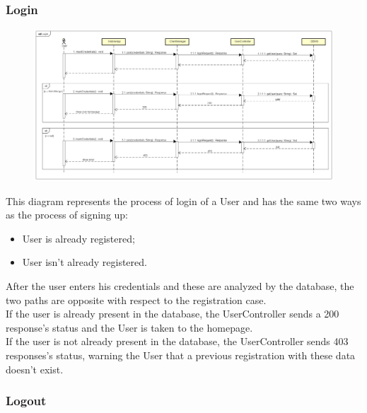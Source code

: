 \newpage
\subsubsection{Login}

\begin{figure}[H]
    \begin{center}
        \includegraphics[width=\textwidth]{Images/SequenceDiagrams/LoginDD.png}
    \end{center}
\end{figure}

This diagram represents the process of login of a User and has the same two ways as the process of signing up:
\begin{itemize}
    \item User is already registered;
    \item User isn't already registered.
\end{itemize}
After the user enters his credentials and these are analyzed by the database, 
the two paths are opposite with respect to the registration case.\\
If the user is already present in the database, the UserController sends a 
200 response's status and the User is taken to the homepage.\\
If the user is not already present in the database, the UserController sends 403 responses's status, 
warning the User that a previous registration with these data doesn't exist.


\newpage
\subsubsection{Logout}

